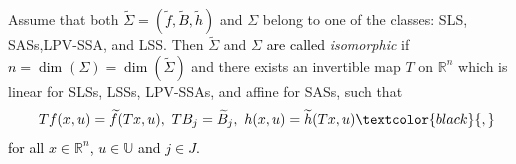 \documentclass[journal,twoside,web]{ieeecolor}
\begin{document}
Assume that both \textcolor{black}{$\widetilde{\Sigma}=(\widetilde{f},\widetilde{B},\widetilde{h})$} and $\Sigma$ belong to one of the classes: SLS, SASs,LPV-SSA, and LSS. Then $\widetilde{\Sigma}$ and $\Sigma$ \textcolor{black}{are called} \emph{isomorphic} if 
\textcolor{black}{$n\!\!=\!\!\dim(\Sigma)\!\!=\!\!\dim(\widetilde{\Sigma})$} and there exists an invertible map $T$ on $\mathbb{R}^n$ 
which is linear for SLSs, LSSs, LPV-SSAs,  and affine for SASs, such that
            \begin{equation*}
                 \begin{array}{rcl}
                 \label{repr:morph:eq2}
                 &Tf(x,u)=\widetilde{f}(Tx,u), ~ TB_j=\widetilde{B}_j,  ~h(x,u)=\widetilde{h}(Tx,u) \textcolor{black}{,}
             \end{array}
            \end{equation*}
            \textcolor{black}{for all $x \in \mathbb{R}^n$, $u \in \mathbb{U}$ and $j \in J$.}
            
\end{document}
